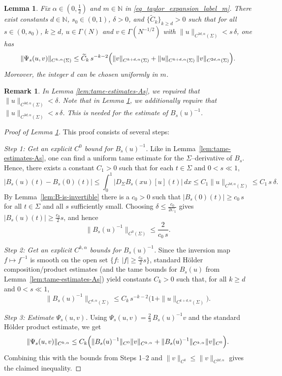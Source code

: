 \documentclass[11pt]{amsart}
\newcommand{\N}{\mathbb{N}}
\newtheorem{lemma}[theorem]{Lemma}
\newtheorem{remark}[theorem]{Remark}
\begin{document}
\begin{lemma}
	\label{lem:tame-estimates-inverse-As}
	Fix $\alpha\in(0,\tfrac12)$ and $m\in\N$ in \eqref{eq_taylor_expansion_label_m}.
	There exist constants $d\in\N$, $s_0\in(0,1)$, $\delta>0$, and $\{\widetilde C_k\}_{k\ge d}>0$
	such that for all $s\in(0,s_0)$, $k\ge d$, $u\in\Gamma(N)$ and $v\in\Gamma(N^{-1/2})$
	with $\|u\|_{C^{3d,\alpha}(\Sigma)}< s\,\delta$, one has
	\[
	\|\Psi_s(u,v)\|_{C^{k,\alpha}(\Sigma)}
	\le \widetilde C_k\, s^{-k-2}\Bigl(
	\|v\|_{C^{k+d,\alpha}(\Sigma)}
	+\|u\|_{C^{k+d,\alpha}(\Sigma)}\,\|v\|_{C^{2d,\alpha}(\Sigma)}
	\Bigr).
	\]
	Moreover, the integer $d$ can be chosen uniformly in $m$.
\end{lemma}

\begin{remark}
In Lemma \ref{lem:tame-estimates-As}, we required that $\|u\|_{C^{3d,\alpha}(\Sigma)}<\delta$. Note that in Lemma \ref{lem:tame-estimates-inverse-As}, we additionally require that $\|u\|_{C^{3d,\alpha}(\Sigma)}<s\,\delta$. This is needed for the estimate of $B_s(u)^{-1}$.
\end{remark}

\begin{proof}[Proof of Lemma \ref{lem:tame-estimates-inverse-As}]
	This proof consists of several steps:
	
	\emph{Step 1: Get an explicit $C^0$ bound for $B_s(u)^{-1}$.}
	Like in Lemma~\ref{lem:tame-estimates-As}, one can find a uniform tame estimate for the $\Sigma$--derivative of $B_s$.
	Hence, there exists a constant $C_1 > 0$ such that for each $t\in\Sigma$ and $0< s \ll 1$,
	\[
	|B_s(u)(t)-B_s(0)(t)|
	\le \int_0^1 \bigl|D_\Sigma B_s(xu)[u](t)\bigr|\,dx
	\le C_1\|u\|_{C^{3d,\alpha}(\Sigma)}
	\le C_1 \,s\:\delta.
	\]
	By Lemma~\ref{lem:B-is-invertible} there is a $c_0>0$ such that
	$|B_s(0)(t)|\ge c_0 \,s$ for all $t\in\Sigma$ and all $s$ sufficiently small.
	Choosing $\delta\le \frac{c_0}{2 C_1}$ gives
	$|B_s(u)(t)|\ge \frac{c_0}{2}s$, and hence
	\[
	\|B_s(u)^{-1}\|_{C^0(\Sigma)}\le \frac{2}{c_0 \,s}.
	\]
	
	\emph{Step 2: Get an explicit $C^{k,\alpha}$ bounds for $B_s(u)^{-1}$.}
	Since the inversion map $f\mapsto f^{-1}$ is smooth on the open set
	$\{f:\ |f|\ge \frac{c_0}{2}s\}$, standard Hölder composition/product estimates
	(and the tame bounds for $B_s(u)$ from Lemma~\ref{lem:tame-estimates-As})
	yield constants $C_k>0$ such that, for all $k\ge d$ and $0 < s \ll 1$,
	\[
	\|B_s(u)^{-1}\|_{C^{k,\alpha}(\Sigma)}
	\le C_k\, s^{-k-2}\bigl(1+\|u\|_{C^{k+d,\alpha}(\Sigma)}\bigr).
	\]

	\emph{Step 3: Estimate $\Psi_s(u,v)$.}
	Using $\Psi_s(u,v)=\frac23\,B_s(u)^{-1}v$ and the standard Hölder product estimate, we get
	\[
	\|\Psi_s(u,v)\|_{C^{k,\alpha}}
	\le C_k\Bigl(\|B_s(u)^{-1}\|_{C^0}\|v\|_{C^{k,\alpha}}
	+\|B_s(u)^{-1}\|_{C^{k,\alpha}}\|v\|_{C^0}\Bigr).
	\]
	Combining this with the bounds from Steps 1--2 and $\|v\|_{C^0}\le \|v\|_{C^{2d,\alpha}}$
	gives the claimed inequality.
\end{proof}
\end{document}
